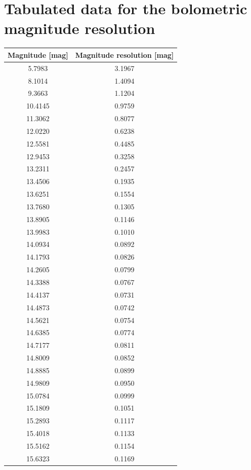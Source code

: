 \documentclass[fleqn,usenatbib]{mnras}
\begin{document}
\section{Tabulated data for the bolometric magnitude resolution}
\label{appexdix:magnitude-resolution}
\begin{table}
    \centering
    \begin{tabular}{c|c}
        Magnitude [mag] & Magnitude resolution [mag] \\\hline\hline
        5.7983 & 3.1967\\
        8.1014 & 1.4094\\
        9.3663 & 1.1204\\
        10.4145 & 0.9759\\
        11.3062 & 0.8077\\
        12.0220 & 0.6238\\
        12.5581 & 0.4485\\
        12.9453 & 0.3258\\
        13.2311 & 0.2457\\
        13.4506 & 0.1935\\\hline
        13.6251 & 0.1554\\
        13.7680 & 0.1305\\
        13.8905 & 0.1146\\
        13.9983 & 0.1010\\
        14.0934 & 0.0892\\
        14.1793 & 0.0826\\
        14.2605 & 0.0799\\
        14.3388 & 0.0767\\
        14.4137 & 0.0731\\
        14.4873 & 0.0742\\\hline
        14.5621 & 0.0754\\
        14.6385 & 0.0774\\
        14.7177 & 0.0811\\
        14.8009 & 0.0852\\
        14.8885 & 0.0899\\
        14.9809 & 0.0950\\
        15.0784 & 0.0999\\
        15.1809 & 0.1051\\
        15.2893 & 0.1117\\
        15.4018 & 0.1133\\\hline
        15.5162 & 0.1154\\
        15.6323 & 0.1169\\

\end{tabular}
\end{table}
\end{document}
